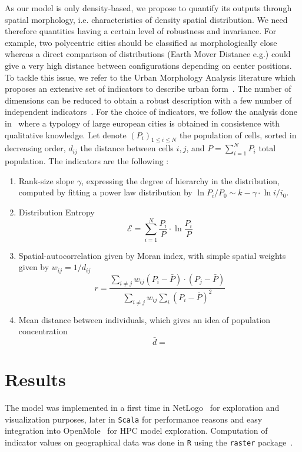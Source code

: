 \documentclass[10pt,letterpaper]{article}
\begin{document}
As our model is only density-based, we propose to quantify its outputs through spatial morphology, i.e. characteristics of density spatial distribution. We need therefore quantities having a certain level of robustness and invariance. For example, two polycentric cities should be classified as morphologically close whereas a direct comparison of distributions (Earth Mover Distance e.g.) could give a very high distance between configurations depending on center positions. To tackle this issue, we refer to the Urban Morphology Analysis literature which proposes an extensive set of indicators to describe urban form~\cite{tsai2005quantifying}. The number of dimensions can be reduced to obtain a robust description with a few number of independent indicators~\cite{Schwarz201029}. For the choice of indicators, we follow the analysis done in~\cite{le2015forme} where a typology of large european cities is obtained in consistence with qualitative knowledge. Let denote $(P_i)_{1\leq i \leq N}$ the population of cells, sorted in decreasing order, $d_{ij}$ the distance between cells $i,j$, and $P=\sum_{i=1}^{N} P_i$ total population. The indicators are the following :

\begin{enumerate}
\item Rank-size slope $\gamma$, expressing the degree of hierarchy in the distribution, computed by fitting a power law distribution by $\ln{P_i/P_0} \sim k - \gamma\cdot \ln{i/i_0}$.
\item Distribution Entropy
\[
\mathcal{E} = \sum_{i=1}^{N}\frac{P_i}{P}\cdot \ln{\frac{P_i}{P}}
\]
\item Spatial-autocorrelation given by Moran index, with simple spatial weights given by $w_{ij} = 1/d_{ij}$
\[
r = \frac{\sum_{i\neq j} w_{ij} \left(P_i - \bar{P}\right)\cdot\left(P_j - \bar{P}\right)}{\sum_{i\neq j} w_{ij} \sum_{i}{\left( P_i - \bar{P}\right)}^2}
\]
\item Mean distance between individuals, which gives an idea of population concentration
\[
\bar{d} = 
\]
\end{enumerate}



\section*{Results}


The model was implemented in a first time in NetLogo~\cite{wilensky1999netlogo} for exploration and visualization purposes, later in \texttt{Scala} for performance reasons and easy integration into OpenMole~\cite{reuillon2013openmole} for HPC model exploration. Computation of indicator values on geographical data was done in \texttt{R} using the \texttt{raster} package~\cite{hijmans2015geographic}.
\end{document}
